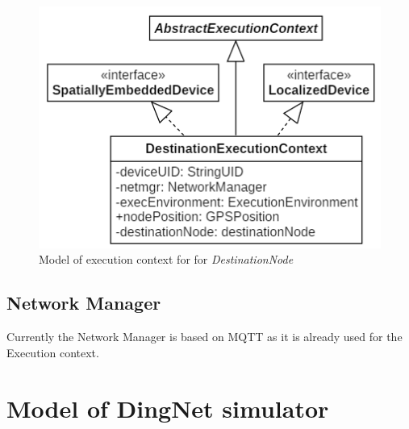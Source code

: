 \begin{figure}[h]
    \centering
    \includegraphics[scale=0.9]{images/execContextModel_v2b.png}
    \caption{Model of execution context for for \textit{DestinationNode}}
    \label{fig:execModel_b}
\end{figure}

\subsection{Network Manager}
Currently the Network Manager is based on MQTT as it is already used for the Execution context.

\section{Model of DingNet simulator}


